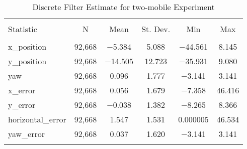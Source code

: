 
\begin{table}[h] \centering 
  \caption{Discrete Filter Estimate for two-mobile Experiment} 
  \label{tab:two_mobile_discrete_summary} 
\begin{tabular}{@{\extracolsep{5pt}}lccccc} 
\\[-1.8ex]\hline 
\hline \\[-1.8ex] 
Statistic & \multicolumn{1}{c}{N} & \multicolumn{1}{c}{Mean} & \multicolumn{1}{c}{St. Dev.} & \multicolumn{1}{c}{Min} & \multicolumn{1}{c}{Max} \\ 
\hline \\[-1.8ex] 
x\_position & 92,668 & $-$5.384 & 5.088 & $-$44.561 & 8.145 \\ 
y\_position & 92,668 & $-$14.505 & 12.723 & $-$35.931 & 9.080 \\ 
yaw & 92,668 & 0.096 & 1.777 & $-$3.141 & 3.141 \\ 
x\_error & 92,668 & 0.056 & 1.679 & $-$7.358 & 46.416 \\ 
y\_error & 92,668 & $-$0.038 & 1.382 & $-$8.265 & 8.366 \\ 
horizontal\_error & 92,668 & 1.547 & 1.531 & 0.000005 & 46.534 \\ 
yaw\_error & 92,668 & 0.037 & 1.620 & $-$3.141 & 3.141 \\ 
\hline \\[-1.8ex] 
\end{tabular} 
\end{table} 

